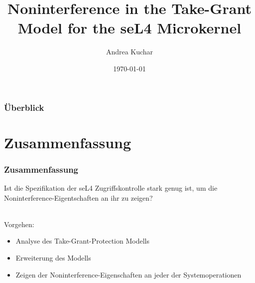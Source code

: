 \documentclass{beamer}
\title[Noninterference in Take-Grant for the seL4]{Noninterference in the Take-Grant Model for the seL4 Microkernel} %
\author{Andrea Kuchar} %
\institute[LMU] %
{
INSTITUT FÜR INFORMATIK \\
DER LUDWIG-MAXIMILIANS-UNIVERSITÄT MÜNCHEN \\
Lehr- und Forschungseinheit für theoretische Informatik \\ %
\medskip
}
\date{\today} %
\begin{document}
\begin{frame}
\titlepage %
\end{frame}

\begin{frame}
\frametitle{Überblick} %
\tableofcontents %
\end{frame}


\section{Zusammenfassung} %
\begin{frame}
\frametitle{Zusammenfassung}
Ist die Spezifikation der seL4 Zugriffskontrolle stark genug ist, um die Noninterference-Eigentschaften an ihr zu zeigen? \\~

Vorgehen:
\begin{itemize}
\item Analyse des Take-Grant-Protection Modells 
\item Erweiterung des Modells
\item Zeigen der Noninterference-Eigenschaften an jeder der Systemoperationen
\end{itemize}
\end{frame}
\end{document}
